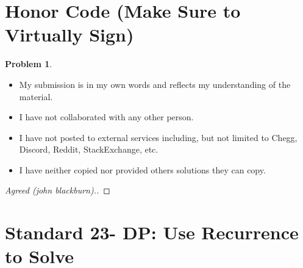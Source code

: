 \documentclass[11pt]{article}
\theoremstyle{definition}
\theoremstyle{definition}
\newtheorem{required}{Problem}
\theoremstyle{definition}
\begin{document}

\section{Honor Code (Make Sure to Virtually Sign)} \label{HonorCode}

\begin{required}
\noindent 
\begin{itemize}
\item My submission is in my own words and reflects my understanding of the material.
\item I have not collaborated with any other person.
\item I have not posted to external services including, but not limited to Chegg, Discord, Reddit, StackExchange, etc.
\item I have neither copied nor provided others solutions they can copy.
\end{itemize}

\end{required}

\begin{proof}[Agreed (john blackburn).]
\end{proof}


\newpage
\section{Standard 23- DP: Use Recurrence to Solve}
\end{document}
